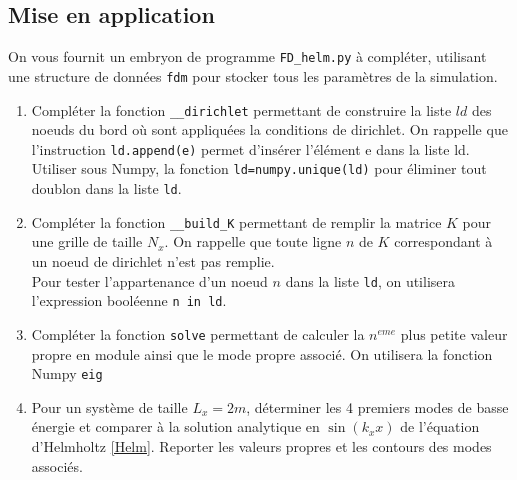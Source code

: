 \documentclass[a4paper, 12pt]{article}
\newcommand{\matlabscript}[2]
  {\begin{itemize}\item[]\end{itemize}}
\begin{document}
  
\subsection{Mise en application}

On vous fournit un embryon de programme {\tt FD\_helm.py}  à compléter,
utilisant une structure de
données {\tt fdm} pour stocker tous les paramètres de la simulation.

\begin{enumerate} 

\item Compléter la fonction  {\tt \_\_dirichlet} permettant de construire la liste $ld$ 
des noeuds du bord où sont appliquées la conditions de dirichlet.
On rappelle que
l'instruction {\tt ld.append(e)} permet d'insérer l'élément e dans la liste ld. 
Utiliser sous Numpy, la fonction {\tt ld=numpy.unique(ld)} pour éliminer tout doublon dans la liste {\tt ld}.


\item Compléter la fonction  {\tt \_\_build\_K} permettant de remplir la matrice $K$ pour une grille
de taille $N_x$.  On rappelle que toute ligne $n$ de $K$ correspondant à un noeud
de dirichlet n'est pas remplie. \\
Pour tester l'appartenance d'un noeud $n$ dans la liste {\tt ld}, on utilisera l'expression booléenne
 {\tt n in ld}. 

\item Compléter  la fonction  {\tt solve} permettant de calculer la $n^{eme}$ plus petite valeur propre
en module ainsi que le mode propre associé. On utilisera la fonction Numpy {\tt eig} 

\item Pour un système de taille $L_x=2m$, déterminer les 4 premiers modes de basse énergie et comparer à la solution analytique en $\sin(k_x x)$ de l'équation d'Helmholtz \eqref{Helm}. 
Reporter les valeurs propres et les contours des modes associés.

\end{enumerate} 

\end{document}
